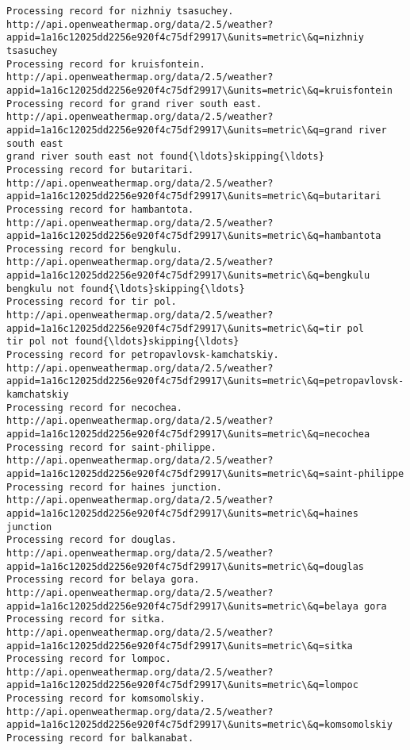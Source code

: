 \documentclass[11pt]{article}
\begin{document}
\begin{Verbatim}[commandchars=\\\{\}]
Processing record for nizhniy tsasuchey.
http://api.openweathermap.org/data/2.5/weather?appid=1a16c12025dd2256e920f4c75df29917\&units=metric\&q=nizhniy tsasuchey
Processing record for kruisfontein.
http://api.openweathermap.org/data/2.5/weather?appid=1a16c12025dd2256e920f4c75df29917\&units=metric\&q=kruisfontein
Processing record for grand river south east.
http://api.openweathermap.org/data/2.5/weather?appid=1a16c12025dd2256e920f4c75df29917\&units=metric\&q=grand river south east
grand river south east not found{\ldots}skipping{\ldots}
Processing record for butaritari.
http://api.openweathermap.org/data/2.5/weather?appid=1a16c12025dd2256e920f4c75df29917\&units=metric\&q=butaritari
Processing record for hambantota.
http://api.openweathermap.org/data/2.5/weather?appid=1a16c12025dd2256e920f4c75df29917\&units=metric\&q=hambantota
Processing record for bengkulu.
http://api.openweathermap.org/data/2.5/weather?appid=1a16c12025dd2256e920f4c75df29917\&units=metric\&q=bengkulu
bengkulu not found{\ldots}skipping{\ldots}
Processing record for tir pol.
http://api.openweathermap.org/data/2.5/weather?appid=1a16c12025dd2256e920f4c75df29917\&units=metric\&q=tir pol
tir pol not found{\ldots}skipping{\ldots}
Processing record for petropavlovsk-kamchatskiy.
http://api.openweathermap.org/data/2.5/weather?appid=1a16c12025dd2256e920f4c75df29917\&units=metric\&q=petropavlovsk-kamchatskiy
Processing record for necochea.
http://api.openweathermap.org/data/2.5/weather?appid=1a16c12025dd2256e920f4c75df29917\&units=metric\&q=necochea
Processing record for saint-philippe.
http://api.openweathermap.org/data/2.5/weather?appid=1a16c12025dd2256e920f4c75df29917\&units=metric\&q=saint-philippe
Processing record for haines junction.
http://api.openweathermap.org/data/2.5/weather?appid=1a16c12025dd2256e920f4c75df29917\&units=metric\&q=haines junction
Processing record for douglas.
http://api.openweathermap.org/data/2.5/weather?appid=1a16c12025dd2256e920f4c75df29917\&units=metric\&q=douglas
Processing record for belaya gora.
http://api.openweathermap.org/data/2.5/weather?appid=1a16c12025dd2256e920f4c75df29917\&units=metric\&q=belaya gora
Processing record for sitka.
http://api.openweathermap.org/data/2.5/weather?appid=1a16c12025dd2256e920f4c75df29917\&units=metric\&q=sitka
Processing record for lompoc.
http://api.openweathermap.org/data/2.5/weather?appid=1a16c12025dd2256e920f4c75df29917\&units=metric\&q=lompoc
Processing record for komsomolskiy.
http://api.openweathermap.org/data/2.5/weather?appid=1a16c12025dd2256e920f4c75df29917\&units=metric\&q=komsomolskiy
Processing record for balkanabat.

\end{Verbatim}
\end{document}
